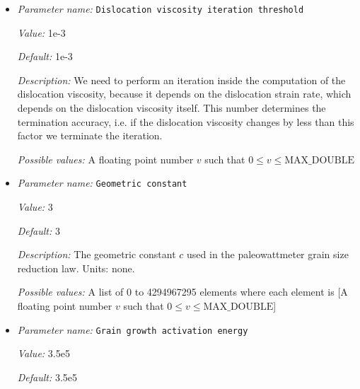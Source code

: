 \begin{itemize}
{\it Possible values:} An integer $n$ such that $0\leq n \leq 2147483647$
\item {\it Parameter name:} {\tt Dislocation viscosity iteration threshold}
\label{parameters:Material model/Grain size model/Dislocation viscosity iteration threshold}
\label{parameters:Material_20model/Grain_20size_20model/Dislocation_20viscosity_20iteration_20threshold}


{\it Value:} 1e-3


{\it Default:} 1e-3


{\it Description:} We need to perform an iteration inside the computation of the dislocation viscosity, because it depends on the dislocation strain rate, which depends on the dislocation viscosity itself. This number determines the termination accuracy, i.e. if the dislocation viscosity changes by less than this factor we terminate the iteration.


{\it Possible values:} A floating point number $v$ such that $0 \leq v \leq \text{MAX\_DOUBLE}$
\item {\it Parameter name:} {\tt Geometric constant}
\label{parameters:Material model/Grain size model/Geometric constant}
\label{parameters:Material_20model/Grain_20size_20model/Geometric_20constant}


{\it Value:} 3


{\it Default:} 3


{\it Description:} The geometric constant $c$ used in the paleowattmeter grain size reduction law. Units: none.


{\it Possible values:} A list of 0 to 4294967295 elements where each element is [A floating point number $v$ such that $0 \leq v \leq \text{MAX\_DOUBLE}$]
\item {\it Parameter name:} {\tt Grain growth activation energy}
\label{parameters:Material model/Grain size model/Grain growth activation energy}
\label{parameters:Material_20model/Grain_20size_20model/Grain_20growth_20activation_20energy}


{\it Value:} 3.5e5


{\it Default:} 3.5e5



\end{itemize}
